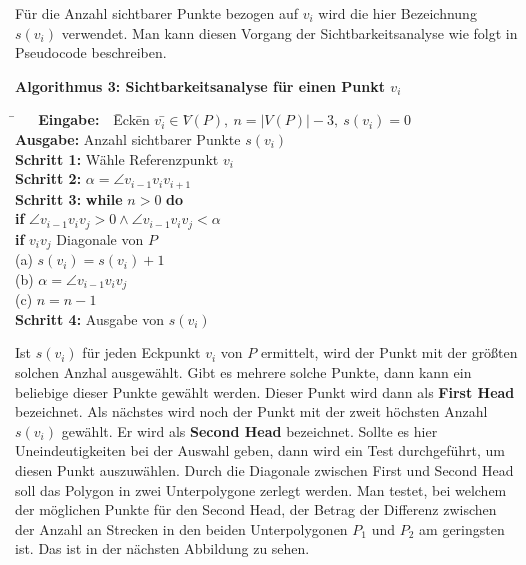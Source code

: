 Für die Anzahl sichtbarer Punkte bezogen auf $v_i$ wird die hier Bezeichnung $s(v_i)$ verwendet. Man kann diesen Vorgang der Sichtbarkeitsanalyse wie folgt in Pseudocode beschreiben.

\begin{flushleft}
    { \textbf{Algorithmus 3: Sichtbarkeitsanalyse für einen Punkt $v_i$}
          \begin{tabbing}
            \=$~~~~~~$ \= \textbf{Eingabe:} $~~~$\=  Eck\=en $v_i$\=$ \in V$\=$(P),~n = |V(P)| - 3,~s(v_i)=0$\\
            \> \> \textbf{Ausgabe:} \> Anzahl sichtbarer Punkte $s(v_i)$\\
            \> \> \textbf{Schritt 1:} \> Wähle Referenzpunkt $v_i$ \\
            \> \> \textbf{Schritt 2:} \>$\alpha = \angle v_{i-1}v_iv_{i+1}$\\
            \> \> \textbf{Schritt 3:} \>\textbf{while} $n > 0$ \textbf{do}\\
            \> \> \> \> \textbf{if} $\angle v_{i-1}v_iv_j > 0 \wedge \angle v_{i-1}v_iv_j < \alpha$\\
            \> \> \> \> \> \textbf{if} $v_iv_j$ Diagonale von $P$\\
            \> \> \> \> \> \> (a) $s(v_i)= s(v_i)+1$\\
            \> \> \> \> \> \> (b) $\alpha = \angle v_{i-1}v_iv_j$\\
            \> \> \> \> \> \> (c) $n = n-1$\\
            \> \> \textbf{Schritt 4:} \> Ausgabe von $s(v_i)$ 

          \end{tabbing}
  }
  \end{flushleft}

Ist $s(v_i)$ für jeden Eckpunkt $v_i$ von $P$ ermittelt, wird der Punkt mit der größten solchen Anzhal ausgewählt. Gibt es mehrere solche Punkte, dann 
kann ein beliebige dieser Punkte gewählt werden. Dieser Punkt wird dann als \textbf{First Head} bezeichnet.
Als nächstes wird noch der Punkt mit der zweit höchsten Anzahl $s(v_i)$ gewählt. Er wird als \textbf{Second Head} bezeichnet. Sollte es hier Uneindeutigkeiten
bei der Auswahl geben, dann wird ein Test durchgeführt, um diesen Punkt auszuwählen. Durch die Diagonale zwischen First und Second Head soll das Polygon in zwei 
Unterpolygone zerlegt werden. Man testet, bei welchem der möglichen Punkte für den Second Head, der Betrag der Differenz zwischen der Anzahl an Strecken in den beiden 
Unterpolygonen $P_1$ und $P_2$ am geringsten ist. Das ist in der nächsten Abbildung zu sehen.

